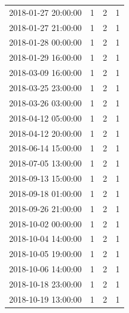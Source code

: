 \begin{tabular}{lrrr}
2018-01-27 20:00:00 & 1 & 2 & 1 \\
2018-01-27 21:00:00 & 1 & 2 & 1 \\
2018-01-28 00:00:00 & 1 & 2 & 1 \\
2018-01-29 16:00:00 & 1 & 2 & 1 \\
2018-03-09 16:00:00 & 1 & 2 & 1 \\
2018-03-25 23:00:00 & 1 & 2 & 1 \\
2018-03-26 03:00:00 & 1 & 2 & 1 \\
2018-04-12 05:00:00 & 1 & 2 & 1 \\
2018-04-12 20:00:00 & 1 & 2 & 1 \\
2018-06-14 15:00:00 & 1 & 2 & 1 \\
2018-07-05 13:00:00 & 1 & 2 & 1 \\
2018-09-13 15:00:00 & 1 & 2 & 1 \\
2018-09-18 01:00:00 & 1 & 2 & 1 \\
2018-09-26 21:00:00 & 1 & 2 & 1 \\
2018-10-02 00:00:00 & 1 & 2 & 1 \\
2018-10-04 14:00:00 & 1 & 2 & 1 \\
2018-10-05 19:00:00 & 1 & 2 & 1 \\
2018-10-06 14:00:00 & 1 & 2 & 1 \\
2018-10-18 23:00:00 & 1 & 2 & 1 \\
2018-10-19 13:00:00 & 1 & 2 & 1 \\
\bottomrule
\end{tabular}
